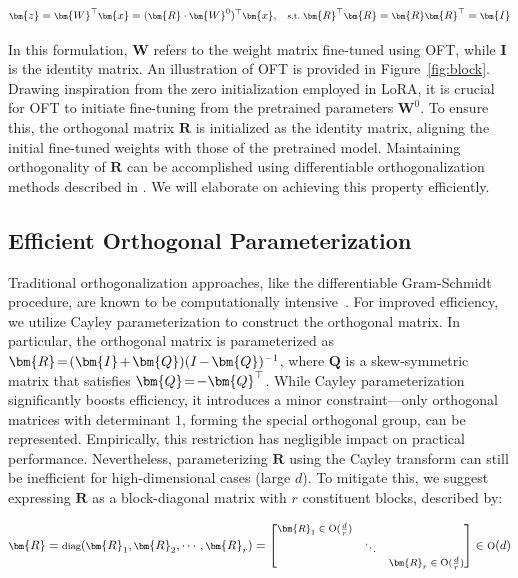 \begin{equation}\label{eq:oft_general}
    \footnotesize
    \bm{z} = \bm{W}^\top \bm{x} = (\bm{R} \cdot \bm{W}^0)^\top \bm{x},~~~\text{s.t.}~\bm{R}^\top \bm{R} = \bm{R} \bm{R}^\top = \bm{I}
\end{equation}

In this formulation, $\bm{W}$ refers to the weight matrix fine-tuned using OFT, while $\bm{I}$ is the identity matrix. An illustration of OFT is provided in Figure~\ref{fig:block}. Drawing inspiration from the zero initialization employed in LoRA, it is crucial for OFT to initiate fine-tuning from the pretrained parameters $\bm{W}^0$. To ensure this, the orthogonal matrix $\bm{R}$ is initialized as the identity matrix, aligning the initial fine-tuned weights with those of the pretrained model. Maintaining orthogonality of $\bm{R}$ can be accomplished using differentiable orthogonalization methods described in \cite{liu2021orthogonal,lezcano2019cheap}. We will elaborate on achieving this property efficiently.

\subsection{Efficient Orthogonal Parameterization}\label{sect:eff_ortho}

Traditional orthogonalization approaches, like the differentiable Gram-Schmidt procedure, are known to be computationally intensive~\cite{liu2021orthogonal}. For improved efficiency, we utilize Cayley parameterization to construct the orthogonal matrix. In particular, the orthogonal matrix is parameterized as $\thickmuskip=2mu \medmuskip=2mu \bm{R}=(\bm{I}+\bm{Q})(I-\bm{Q})^{-1}$, where $\bm{Q}$ is a skew-symmetric matrix that satisfies $\thickmuskip=2mu \medmuskip=2mu \bm{Q}=-\bm{Q}^\top$. While Cayley parameterization significantly boosts efficiency, it introduces a minor constraint—only orthogonal matrices with determinant $1$, forming the special orthogonal group, can be represented. Empirically, this restriction has negligible impact on practical performance. Nevertheless, parameterizing $\bm{R}$ using the Cayley transform can still be inefficient for high-dimensional cases (large $d$). To mitigate this, we suggest expressing $\bm{R}$ as a block-diagonal matrix with $r$ constituent blocks, described by:

\begin{equation}
    \footnotesize
    \bm{R} = \text{diag}(\bm{R}_1, \bm{R}_2, \cdots, \bm{R}_r) = \begin{bmatrix}
    \bm{R}_1 \in \text{O}(\frac{d}{r}) &  &\\
    & \ddots & \\
    & & \bm{R}_r \in \text{O}(\frac{d}{r})
    \end{bmatrix} \in \text{O}(d)
\end{equation}

